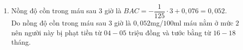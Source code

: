 \begin{ex}
{\begin{enumerate}
			      Từ đồ thị ta có hàm số đi qua các điểm $(0;0{,}076)$ và $(1;0{,}068)$ nên ta được
			      $\heva{& BAC=0{,}076 \\ & a=-\dfrac{1}{125}.}$\\
			      Công thức biểu thị mối quan hệ giữa nồng độ cồn trong máu $(BAC)$ sau $t$ giờ sử dụng là $BAC=-\dfrac{1}{125}t+0{,}076$.
			\item Nồng độ cồn trong máu sau $3$ giờ là $BAC=-\dfrac{1}{125}\cdot 3+0{,}076=0{,}052$.\\
			      Do nồng độ cồn trong máu sau $3$ giờ là $0{,}052$mg/$100$ml máu nằm ở mức $2$ nên người này bị phạt tiền từ $04-05$ triệu đồng  và tước bằng từ $16-18$ tháng.
		\end{enumerate}
	}
\end{ex}


%
